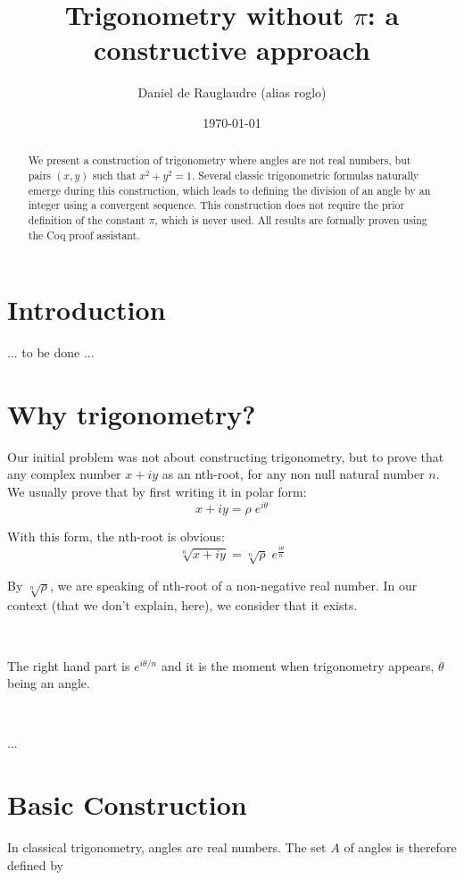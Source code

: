 \documentclass[11pt]{article}
\title{Trigonometry without $\pi$: a constructive approach}
\author{Daniel de Rauglaudre (alias roglo)}
\date{\today}
\theoremstyle{definition}
\begin{document}
\maketitle

\begin{abstract}
We present a construction of trigonometry where angles are not real
numbers, but pairs $(x,y)$ such that $x^2 + y^2 = 1$. Several classic
trigonometric formulas naturally emerge during this construction,
which leads to defining the division of an angle by an integer using a
convergent sequence. This construction does not require the prior
definition of the constant $\pi$, which is never used. All results are
formally proven using the Coq proof assistant.
\end{abstract}

\section{Introduction}

... to be done ...

\section{Why trigonometry?}

Our initial problem was not about constructing trigonometry, but to
prove that any complex number $x+iy$ as an nth-root, for any non null
natural number $n$. We usually prove that by first writing it in polar
form:
\[
x + i y = \rho \; e^{i \theta}
\]

\noindent With this form, the nth-root is obvious:
\[
\sqrt[n]{x + i y} = \sqrt[n]\rho \; e^{\frac{i\theta}{n}}
\]

\noindent By $\sqrt[n]\rho$, we are speaking of nth-root of a
non-negative real number. In our context (that we don't explain,
here), we consider that it exists.

\

\noindent The right hand part is $e^{i\theta/n}$ and it is the moment
when trigonometry appears, $\theta$ being an angle.

\

...

\section{Basic Construction}

In classical trigonometry, angles are real numbers. The set \( A \) of
angles is therefore defined by
\end{document}
